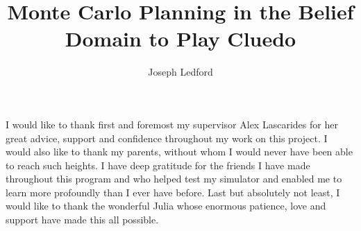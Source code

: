 \documentclass[msc, ai, twoside, notimes, logo, parskip, leftchapter, normalheadings]{infthesis}
\begin{document}
\begin{preliminary}
\title{Monte Carlo Planning in the Belief Domain to Play Cluedo}
\author{Joseph Ledford}


\maketitle

\begin{acknowledgements}
I would like to thank first and foremost my supervisor Alex Lascarides for her great advice, support and confidence throughout my work on this project. I would also like to thank my parents, without whom I would never have been able to reach such heights. I have deep gratitude for the friends I have made throughout this program and who helped test my simulator and enabled me to learn more profoundly than I ever have before. Last but absolutely not least, I would like to thank the wonderful Julia whose enormous patience, love and support have made this all possible.
\end{acknowledgements}

\standarddeclaration

\tableofcontents

\end{preliminary}
\end{document}
